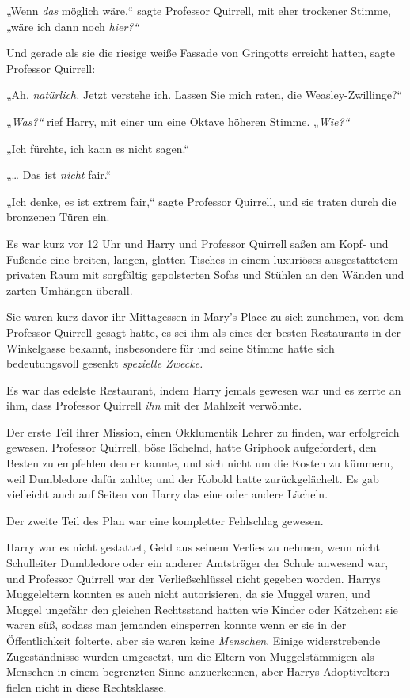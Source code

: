 {„Wenn \emph{das} möglich wäre,“ sagte Professor Quirrell, mit eher trockener Stimme, „wäre ich dann noch \emph{hier?“}

Und gerade als sie die riesige weiße Fassade von Gringotts erreicht hatten, sagte Professor Quirrell:

„Ah, \emph{natürlich.} Jetzt verstehe ich. Lassen Sie mich raten, die Weasley-Zwillinge?“

„\emph{Was?“} rief Harry, mit einer um eine Oktave höheren Stimme. „\emph{Wie?“}

„Ich fürchte, ich kann es nicht sagen.“

„… Das ist \emph{nicht} fair.“

„Ich denke, es ist extrem fair,“ sagte Professor Quirrell, und sie traten durch die bronzenen Türen ein.

Es war kurz vor 12 Uhr und Harry und Professor Quirrell saßen am Kopf- und Fußende eine breiten, langen, glatten Tisches in einem luxuriöses ausgestattetem privaten Raum mit sorgfältig gepolsterten Sofas und Stühlen an den Wänden und zarten Umhängen überall.

Sie waren kurz davor ihr Mittagessen in Mary's Place zu sich zunehmen, von dem Professor Quirrell gesagt hatte, es sei ihm als eines der besten Restaurants in der Winkelgasse bekannt, insbesondere für \later und seine Stimme hatte sich bedeutungsvoll gesenkt \later \emph{spezielle Zwecke.}

Es war das edelste Restaurant, indem Harry jemals gewesen war und es zerrte an ihm, dass Professor Quirrell \emph{ihn} mit der Mahlzeit verwöhnte.

Der erste Teil ihrer Mission, einen Okklumentik Lehrer zu finden, war erfolgreich gewesen. Professor Quirrell, böse lächelnd, hatte Griphook aufgefordert, den Besten zu empfehlen den er kannte, und sich nicht um die Kosten zu kümmern, weil Dumbledore dafür zahlte; und der Kobold hatte zurückgelächelt. Es gab vielleicht auch auf Seiten von Harry das eine oder andere Lächeln.

Der zweite Teil des Plan war eine kompletter Fehlschlag gewesen.

Harry war es nicht gestattet, Geld aus seinem Verlies zu nehmen, wenn nicht Schulleiter Dumbledore oder ein anderer Amtsträger der Schule anwesend war, und Professor Quirrell war der Verließschlüssel nicht gegeben worden. Harrys Muggeleltern konnten es auch nicht autorisieren, da sie Muggel waren, und Muggel ungefähr den gleichen Rechtsstand hatten wie Kinder oder Kätzchen: sie waren süß, sodass man jemanden einsperren konnte wenn er sie in der Öffentlichkeit folterte, aber sie waren keine \emph{Menschen}. Einige widerstrebende Zugeständnisse wurden umgesetzt, um die Eltern von Muggelstämmigen als Menschen in einem begrenzten Sinne anzuerkennen, aber Harrys Adoptiveltern fielen nicht in diese Rechtsklasse.

}
